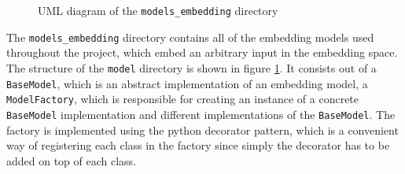 \begin{figure}[t]
{
    }
	\caption{UML diagram of the \texttt{models\_embedding} directory}
	\label{fig:UML-Models-Embedding}
\end{figure}
\noindent
The \texttt{models\_embedding} directory contains all of the embedding models used throughout the project, which embed an arbitrary input in the embedding space. The structure of the \texttt{model} directory is shown in figure \ref{fig:UML-Models-Embedding}. It consists out of a \texttt{BaseModel}, which is an abstract implementation of an embedding model, a \texttt{ModelFactory}, which is responsible for creating an instance of a concrete \texttt{BaseModel} implementation and different implementations of the \texttt{BaseModel}. The factory is implemented using the python decorator pattern, which is a convenient way of registering each class in the factory since simply the decorator has to be added on top of each class.

